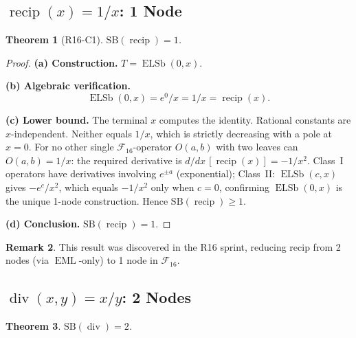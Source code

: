 \documentclass[12pt,a4paper]{article}
\newtheorem{theorem}{Theorem}[section]
\theoremstyle{definition}
\newtheorem{remark}[theorem]{Remark}
\newcommand{\EML}{\operatorname{EML}}
\newcommand{\ELSb}{\operatorname{ELSb}}
\newcommand{\recip}{\operatorname{recip}}
\newcommand{\divop}{\operatorname{div}}
\newcommand{\SB}{\mathrm{SB}}
\newcommand{\F}{\mathcal{F}_{16}}
\begin{document}
\subsection{\texorpdfstring{$\recip(x) = 1/x$}{recip(x)}: 1 Node}
\label{sec:recip}

\begin{theorem}[R16-C1]
\label{thm:recip}
$\SB(\recip) = 1$.
\end{theorem}

\begin{proof}
\textbf{(a) Construction.}
$T = \ELSb(0,x)$.

\textbf{(b) Algebraic verification.}
\[
  \ELSb(0,x) = e^0 / x = 1/x = \recip(x).
\]

\textbf{(c) Lower bound.}
The terminal $x$ computes the identity.
Rational constants are $x$-independent.
Neither equals $1/x$, which is strictly decreasing with a pole at $x=0$.
For no other single $\F$-operator $O(a,b)$ with two leaves can $O(a,b) = 1/x$:
the required derivative is $d/dx\,[\recip(x)] = -1/x^2$.
Class~I operators have derivatives involving $e^{\pm a}$ (exponential);
Class~II: $\ELSb(c,x)$ gives $-e^c/x^2$, which equals $-1/x^2$ only when $c=0$,
confirming $\ELSb(0,x)$ is the unique 1-node construction.
Hence $\SB(\recip) \ge 1$.

\textbf{(d) Conclusion.} $\SB(\recip) = 1$.
\end{proof}

\begin{remark}
This result was discovered in the R16 sprint, reducing recip from 2 nodes
(via $\EML$-only) to 1 node in $\mathcal{F}_{16}$.
\end{remark}

\subsection{\texorpdfstring{$\divop(x,y) = x/y$}{div(x,y)}: 2 Nodes}
\label{sec:div}

\begin{theorem}
\label{thm:div}
$\SB(\divop) = 2$.
\end{theorem}
\end{document}
